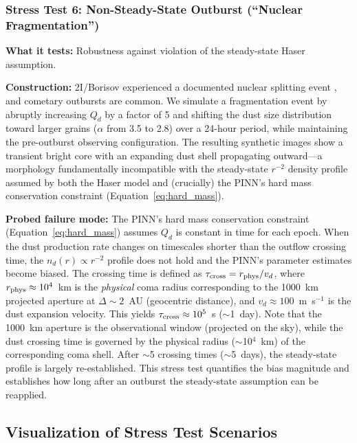 \documentclass[usenatbib]{mnras}
\begin{document}
\subsubsection{Stress Test 6: Non-Steady-State Outburst (``Nuclear Fragmentation'')}

\textbf{What it tests:} Robustness against violation of the steady-state Haser assumption.

\textbf{Construction:} 2I/Borisov experienced a documented nuclear splitting event \citep{jewitt20}, and cometary outbursts are common. We simulate a fragmentation event by abruptly increasing $Q_d$ by a factor of 5 and shifting the dust size distribution toward larger grains ($\alpha$ from 3.5 to 2.8) over a 24-hour period, while maintaining the pre-outburst observing configuration. The resulting synthetic images show a transient bright core with an expanding dust shell propagating outward---a morphology fundamentally incompatible with the steady-state $r^{-2}$ density profile assumed by both the Haser model and (crucially) the PINN's hard mass conservation constraint (Equation~\ref{eq:hard_mass}).

\textbf{Probed failure mode:} The PINN's hard mass conservation constraint (Equation~\ref{eq:hard_mass}) assumes $Q_d$ is constant in time for each epoch. When the dust production rate changes on timescales shorter than the outflow crossing time, the $n_d(r) \propto r^{-2}$ profile does not hold and the PINN's parameter estimates become biased. The crossing time is defined as $\tau_{\rm cross} = r_{\rm phys} / v_d$, where $r_{\rm phys} \approx 10^4$~km is the \textit{physical} coma radius corresponding to the 1000~km projected aperture at $\Delta\sim2$~AU (geocentric distance), and $v_d\approx100$~m~s$^{-1}$ is the dust expansion velocity. This yields $\tau_{\rm cross} \approx 10^5$~s ($\sim$1~day). Note that the 1000~km aperture is the observational window (projected on the sky), while the dust crossing time is governed by the physical radius ($\sim$10$^4$~km) of the corresponding coma shell. After $\sim$5 crossing times ($\sim$5~days), the steady-state profile is largely re-established. This stress test quantifies the bias magnitude and establishes how long after an outburst the steady-state assumption can be reapplied.

\subsection{Visualization of Stress Test Scenarios}
\end{document}
